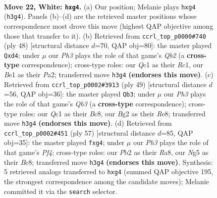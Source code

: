 \documentclass[11pt]{article}
\begin{document}
\clearpage

\begin{figure}[p]\centering
\begin{subfigure}{0.46\textwidth}\centering
\resizebox{\linewidth}{!}{%
\newchessgame
\chessboard[
  setfen={2b1k2r/2p1qp2/8/3p2N1/3n2np/1p5P/1P2PPB1/K1Q1B2R w k - 0 22},
  showmover=false,
  pgfstyle=straightmove, color=movearrow, markmove={h3-g4}
]}
\caption{}
\end{subfigure}\hfill
\begin{subfigure}{0.46\textwidth}\centering
\resizebox{\linewidth}{!}{%
\newchessgame
\chessboard[
  setfen={6k1/ppq1rpp1/5n1p/2P1Nb2/3r1P2/5B1P/PQ4P1/2R3K1 w - - 0 25},
  showmover=false,
  pgfstyle=straightmove, color=movearrow, markmove={b2-d4}
]}
\caption{}
\end{subfigure}
\\[4pt]
\begin{subfigure}{0.46\textwidth}\centering
\resizebox{\linewidth}{!}{%
\newchessgame
\chessboard[
  setfen={2b1rbk1/5Np1/pq3nQp/2p5/P3PP2/4B2P/1P4P1/3R2K1 b - - 4 25},
  showmover=false,
  pgfstyle=straightmove, color=movearrow, markmove={b6-b3}
]}
\caption{}
\end{subfigure}\hfill
\begin{subfigure}{0.46\textwidth}\centering
\resizebox{\linewidth}{!}{%
\newchessgame
\chessboard[
  setfen={r1bq2k1/pp3n1p/4p3/2N1Pp2/6P1/4Q2P/P5B1/2R3K1 b - - 0 29},
  showmover=false,
  pgfstyle=straightmove, color=movearrow, markmove={f5-g4}
]}
\caption{}
\end{subfigure}
\caption{\textbf{Move 22, White: \texttt{hxg4}.} (a) Our position; Melanie plays \texttt{hxg4} (\texttt{h3g4}). Panels (b)--(d) are the retrieved master positions whose correspondence most drove this move (highest QAP objective among those that transfer to it). (b) Retrieved from \texttt{ccrl\_top\_p0000\#740} (ply 48) [structural distance $d$=70, QAP obj=80]: the master played \texttt{Qxd4}; under $\mu$ our \emph{Ph3} plays the role of that game's \emph{Qb2} (a \textbf{cross-type} correspondence); cross-type roles: our \emph{Q}c1 as their \emph{R}c1, our \emph{B}e1 as their \emph{P}a2; transferred move \texttt{h3g4} \textbf{(endorses this move)}. (c) Retrieved from \texttt{ccrl\_top\_p0002\#3913} (ply 49) [structural distance $d$=56, QAP obj=36]: the master played \texttt{Qb3}; under $\mu$ our \emph{Ph3} plays the role of that game's \emph{Qb3} (a \textbf{cross-type} correspondence); cross-type roles: our \emph{Q}c1 as their \emph{B}c8, our \emph{B}g2 as their \emph{R}e8; transferred move \texttt{h3g4} \textbf{(endorses this move)}. (d) Retrieved from \texttt{ccrl\_top\_p0002\#451} (ply 57) [structural distance $d$=85, QAP obj=35]: the master played \texttt{fxg4}; under $\mu$ our \emph{Ph3} plays the role of that game's \emph{Pf4}; cross-type roles: our \emph{P}b2 as their \emph{R}a8, our \emph{N}g5 as their \emph{B}c8; transferred move \texttt{h3g4} \textbf{(endorses this move)}. Synthesis: 5 retrieved analogs transferred to \texttt{hxg4} (summed QAP objective 195, the strongest correspondence among the candidate moves); Melanie committed it via the \texttt{search} selector.}
\label{fig:thought-m42}
\end{figure}
\end{document}
